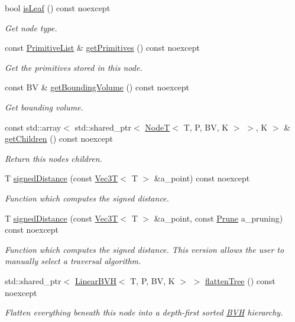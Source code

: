 \begin{DoxyCompactItemize}
\mbox{\label{classBVH_1_1NodeT_a5c57552524601da9bf20e722e2433aa0}} 
bool \hyperlink{classBVH_1_1NodeT_a5c57552524601da9bf20e722e2433aa0}{is\+Leaf} () const noexcept
\begin{DoxyCompactList}\small\item\em Get node type. \end{DoxyCompactList}\item 
const \hyperlink{classBVH_1_1NodeT_a19cce6e7fbe85eccb4a3718dd69f49b7}{Primitive\+List} \& \hyperlink{classBVH_1_1NodeT_a2e0c1e030162a2dc049acb4debd4d9f2}{get\+Primitives} () const noexcept
\begin{DoxyCompactList}\small\item\em Get the primitives stored in this node. \end{DoxyCompactList}\item 
const BV \& \hyperlink{classBVH_1_1NodeT_a02cba4dcb065ebfaeea7e4d251b89d04}{get\+Bounding\+Volume} () const noexcept
\begin{DoxyCompactList}\small\item\em Get bounding volume. \end{DoxyCompactList}\item 
const std\+::array$<$ std\+::shared\+\_\+ptr$<$ \hyperlink{classBVH_1_1NodeT}{NodeT}$<$ T, P, BV, K $>$ $>$, K $>$ \& \hyperlink{classBVH_1_1NodeT_ac8df9e7b154186207263b8727e1084a8}{get\+Children} () const noexcept
\begin{DoxyCompactList}\small\item\em Return this node\textquotesingle{}s children. \end{DoxyCompactList}\item 
T \hyperlink{classBVH_1_1NodeT_a0fe074fbff56ac2d0a6ad113ed34d56b}{signed\+Distance} (const \hyperlink{classVec3T}{Vec3T}$<$ T $>$ \&a\+\_\+point) const noexcept
\begin{DoxyCompactList}\small\item\em Function which computes the signed distance. \end{DoxyCompactList}\item 
T \hyperlink{classBVH_1_1NodeT_a1f9067b43b1a6962854f4a2b43325858}{signed\+Distance} (const \hyperlink{classVec3T}{Vec3T}$<$ T $>$ \&a\+\_\+point, const \hyperlink{namespaceBVH_a3ddb7b34ac1deb3baed2f32d9eacbe5b}{Prune} a\+\_\+pruning) const noexcept
\begin{DoxyCompactList}\small\item\em Function which computes the signed distance. This version allows the user to manually select a traversal algorithm. \end{DoxyCompactList}\item 
std\+::shared\+\_\+ptr$<$ \hyperlink{classBVH_1_1LinearBVH}{Linear\+B\+VH}$<$ T, P, BV, K $>$ $>$ \hyperlink{classBVH_1_1NodeT_acb801f1e446a6472f5d330e85318bdb3}{flatten\+Tree} () const noexcept
\begin{DoxyCompactList}\small\item\em Flatten everything beneath this node into a depth-\/first sorted \hyperlink{namespaceBVH}{B\+VH} hierarchy. \end{DoxyCompactList}\end{DoxyCompactItemize}
